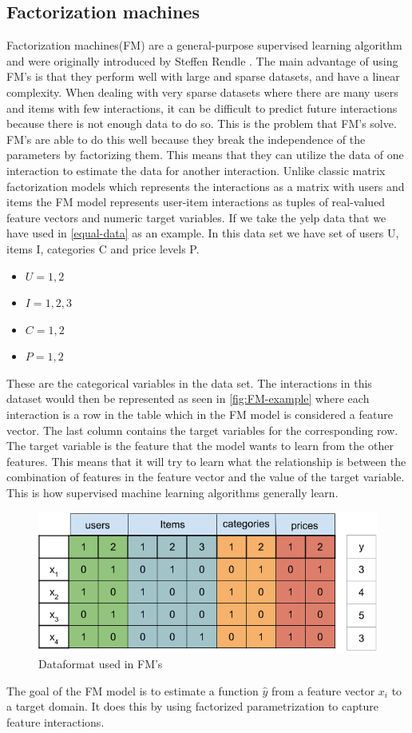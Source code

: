 \subsection{Factorization machines}
Factorization machines(FM) are a general-purpose supervised learning algorithm and were originally introduced by Steffen Rendle \cite{factorization_machines}.
The main advantage of using FM's is that they perform well with large and sparse datasets, and have a linear complexity.
When dealing with very sparse datasets where there are many users and items with few interactions, it can be difficult to predict future interactions because there is not enough data to do so.
This is the problem that FM's solve.
FM's are able to do this well because they break the independence of the parameters by factorizing them.
This means that they can utilize the data of one interaction to estimate the data for another interaction.
Unlike classic matrix factorization models which represents the interactions as a matrix with users and items the FM model represents user-item interactions as tuples of real-valued feature vectors and numeric target variables.
If we take the yelp data that we have used in \autoref{equal-data} as an example.
In this data set we have set of users U, items I, categories C and price levels P.
\begin{itemize}
    \item $U = {1, 2}$
    \item $I = {1, 2 ,3}$
    \item $C = {1, 2}$
    \item $P = {1, 2}$
\end{itemize}
These are the categorical variables in the data set.
The interactions in this dataset would then be represented as seen in \autoref{fig:FM-example} where each interaction is a row in the table which in the FM model is considered a feature vector.
The last column contains the target variables for the corresponding row.
The target variable is the feature that the model wants to learn from the other features.
This means that it will try to learn what the relationship is between the combination of features in the feature vector and the value of the target variable.
This is how supervised machine learning algorithms generally learn.
\begin{figure}
    \centering
    \includegraphics[scale=0.35]{figures/FM-example.png}
    \caption{Dataformat used in FM's}
    \label{fig:FM-example}
\end{figure}
The goal of the FM model is to estimate a function $\hat{y}$ from a feature vector $x_i$ to a target domain.
It does this by using factorized parametrization to capture feature interactions.

